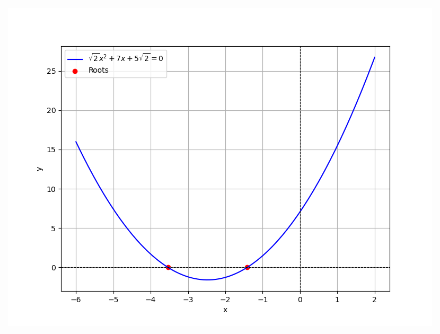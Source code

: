 \documentclass[journal]{IEEEtran}
\numberwithin{equation}{enumi}
\numberwithin{figure}{enumi}
\begin{document}
\begin{enumerate}
\begin{enumerate}
\end{enumerate}



\begin{figure}[h!]
   \centering
   \includegraphics[width=0.7\linewidth]{figs/Figure_2.png}
\end{figure}
\end{enumerate}
\end{document}
